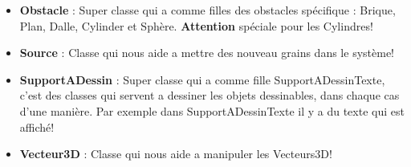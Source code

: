 \documentclass[a4paper,10pt]{article}
\begin{document}
\begin{itemize}
 \item \textbf{Obstacle} : Super classe qui a comme filles des obstacles spécifique : Brique, Plan, Dalle, Cylinder et Sphère. \textbf{Attention} spéciale pour les Cylindres!
 
 \item \textbf{Source} : Classe qui nous aide a mettre des nouveau grains dans le système!
 
 \item \textbf{SupportADessin} : Super classe qui a comme fille SupportADessinTexte, c'est des classes qui servent a dessiner les objets dessinables, dans chaque cas d'une manière. Par exemple dans SupportADessinTexte il y a du texte qui est affiché!
 
  \item \textbf{Vecteur3D} : Classe qui nous aide a manipuler les Vecteurs3D!
 
\end{itemize}
\end{document}

